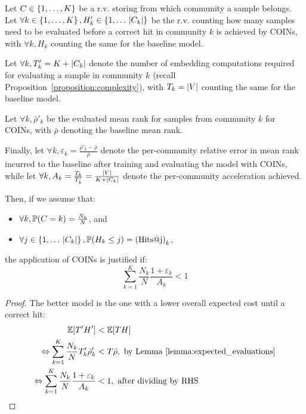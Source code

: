 \begin{proposition}
    \label{proposition:condition_applicability}
    Let $C \in \mathopen{}\left\{1,\dots,K\right\}$ be a r.v. storing from which community a sample belongs. Let $\forall k \in \mathopen{}\left\{1,\dots,K\right\}, H'_k \in \mathopen{}\left\{1,\dots\,\mathopen{}\left|C_k\right|\right\}$ be the r.v. counting how many samples need to be evaluated before a correct hit in community $k$ is achieved by COINs, with $\forall k, H_k$ counting the same for the baseline model. 
    
    Let $\forall k, T'_k=K+\mathopen{}\left|C_k\right|$ denote the number of embedding computations required for evaluating a sample in community $k$ (recall Proposition~\ref{proposition:complexity}), with $T_k=\mathopen{}\left|V\right|$ counting the same for the baseline model. 
    
    Let $\forall k, \bar{\rho}'_k$ be the evaluated mean rank for samples from community $k$ for COINs, with $\bar{\rho}$ denoting the baseline mean rank. 
    
    Finally, let $\forall k, \varepsilon_k = \frac{\bar{\rho}'_k - \bar{\rho}}{\bar{\rho}}$ denote the per-community relative error in mean rank incurred to the baseline after training and evaluating the model with COINs, while let $\forall k, A_k=\frac{T_k}{T'_k}=\frac{\mathopen{}\left|V\right|}{K+\mathopen{}\left|C_k\right|}$ denote the per-community acceleration achieved. 
    
    Then, if we assume that:
    \begin{itemize}
        \item $\forall k, \mathbb{P}\mathopen{}\left(C=k\right)=\frac{N_k}{N}$, and
        \item $\forall j \in \mathopen{}\left\{1,\dots\,\mathopen{}\left|C_k\right|\right\}, \mathbb{P}\mathopen{}\left(H_k \leq j\right)=\mathopen{}\left(\text{Hits@j}\right)_k$,
    \end{itemize}
     the application of COINs is justified if:
    \begin{equation}
        \label{eq:condition_applicability}
        \sum_{k=1}^{K}{\frac{N_k}{N} \frac{1 + \varepsilon_k}{A_k}} < 1
    \end{equation}
\end{proposition}
\begin{proof}
The better model is the one with a lower overall expected cost until a correct hit:
    \begin{align}
    \begin{split}
        \mathbb{E}\mathopen{}\left[T' H'\right] &< \mathbb{E}\mathopen{}\left[T H\right] \\
        \Leftrightarrow \sum_{k=1}^{K}{\frac{N_k}{N} T'_k \bar{\rho}'_k} &< T \bar{\rho}, \text{ by Lemma~\ref{lemma:expected_evaluations}} \\
        \Leftrightarrow \sum_{k=1}^{K}{\frac{N_k}{N} \frac{1 + \varepsilon_k}{A_k}} &< 1, \text{ after dividing by RHS}
    \end{split}
    \end{align}
\end{proof}%

